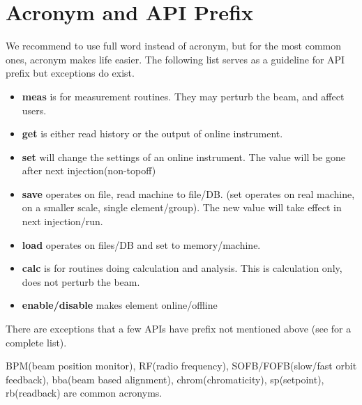 \documentclass[11pt,oneside,letterpaper,showtrims,article]{memoir}
\newcommand{\strong}[1]{{\bfseries #1}}
\begin{document}
\appendix

\chapter{Acronym and API Prefix}

We recommend to use full word instead of acronym, but for the most
common ones, acronym makes life easier. The following list serves as a
guideline for API prefix but exceptions do exist.
\begin{itemize}
\item \strong{meas} is for measurement routines. They may perturb the beam, and affect users.
\item \strong{get} is either read history or the output of online instrument.
\item \strong{set} will change the settings of an online instrument. The value will be gone after next injection(non-topoff)
\item \strong{save} operates on file, read machine to file/DB. (set operates on real machine, on a smaller scale, single element/group). The new value will take effect in next injection/run. 
\item \strong{load} operates on files/DB and set to memory/machine.
\item \strong{calc} is for routines doing calculation and analysis. This is calculation only, does not perturb the beam.
\item \strong{enable/disable} makes element online/offline
\end{itemize}

There are exceptions that a few APIs have prefix not mentioned above
(see \cite{shen_hla_apis} for a complete list).

BPM(beam position monitor), RF(radio frequency), SOFB/FOFB(slow/fast
orbit feedback), bba(beam based alignment), chrom(chromaticity),
sp(setpoint), rb(readback) are common acronyms.


%
%
\end{document}
